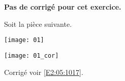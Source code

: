 \normaltrue \difficilefalse \tdifficilefalse
\correctionfalse


\setcounter{question}{0}

\ifcorrection
\else
\textbf{Pas de corrigé pour cet exercice.}
\fi


\ifprof 
\else
Soit la pièce suivante.
\begin{center}
\texttt{[image: 01]}
\end{center}
 \fi
 
\ifprof\begin{center}
\texttt{[image: 01\_cor]}
\end{center}
\else 
\fi

\ifprof
\else
\begin{flushright}
\footnotesize{Corrigé  voir \ref{E2:05:1017}.}
\end{flushright}%
\fi